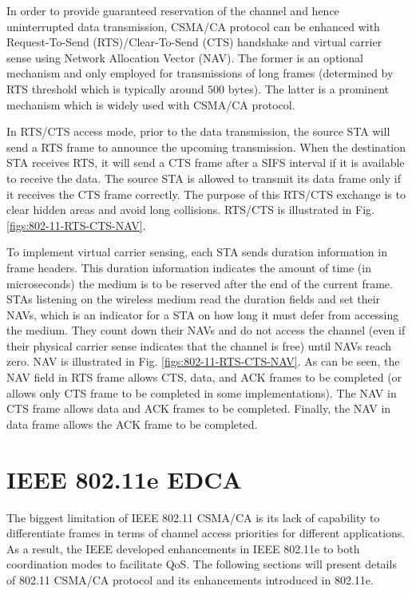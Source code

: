 In order to provide guaranteed reservation of the channel and hence uninterrupted data transmission, CSMA/CA protocol can be enhanced with Request-To-Send (RTS)/Clear-To-Send (CTS) handshake and virtual carrier sense using Network Allocation Vector (NAV). The former is an optional mechanism and only employed for transmissions of long frames (determined by RTS threshold which is typically around $500$ bytes). The latter is a prominent mechanism which is widely used with CSMA/CA protocol.

In RTS/CTS access mode, prior to the data transmission, the source STA will send a RTS frame to announce the upcoming transmission. When the destination STA receives RTS, it will send a CTS frame after a SIFS interval if it is available to receive the data. The source STA is allowed to transmit its data frame only if it receives the CTS frame correctly. The purpose of this RTS/CTS exchange is to clear hidden areas and avoid long collisions. RTS/CTS is illustrated in Fig. \ref{figs:802-11-RTS-CTS-NAV}.

To implement virtual carrier sensing, each STA sends duration information in frame headers. This duration information indicates the amount of time (in microseconds) the medium is to be reserved after the end of the current frame. STAs listening on the wireless medium read the duration fields and set their NAVs, which is an indicator for a STA on how long it must defer from accessing the medium. They count down their NAVs and do not access the channel (even if their physical carrier sense indicates that the channel is free) until NAVs reach zero. NAV is illustrated in Fig. \ref{figs:802-11-RTS-CTS-NAV}. As can be seen, the NAV field in RTS frame allows CTS, data, and ACK frames to be completed (or allows only CTS frame to be completed in some implementations). The NAV in CTS frame allows data and ACK frames to be completed. Finally, the NAV in data frame allows the ACK frame to be completed.


\section{IEEE 802.11e EDCA}
\label{80211e}

The biggest limitation of IEEE 802.11 CSMA/CA is its lack of capability to differentiate frames in terms of channel access priorities for different applications. As a result, the IEEE developed enhancements in IEEE 802.11e to both coordination modes to facilitate QoS. The following sections will present details of 802.11 CSMA/CA protocol and its enhancements introduced in 802.11e. 

